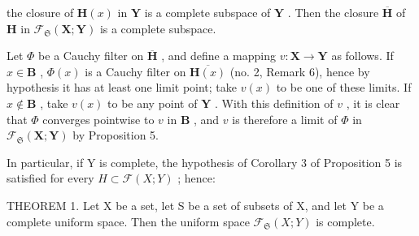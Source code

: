 the closure of \(\mathbf{H}(x)\) in \(\mathbf{Y}\) is a complete subspace of \(\mathbf{Y}\) . Then the closure \(\overline{\mathbf{H}}\) of \(\mathbf{H}\) in \(\mathcal{F}_{\mathfrak{S}}(\mathbf{X};\mathbf{Y})\) is a complete subspace.

Let \(\Phi\) be a Cauchy filter on \(\overline{\mathbf{H}}\) , and define a mapping \(v: \mathbf{X} \to \mathbf{Y}\) as follows. If \(x \in \mathbf{B}\) , \(\Phi(x)\) is a Cauchy filter on \(\overline{\mathbf{H}(x)}\) (no. 2, Remark 6), hence by hypothesis it has at least one limit point; take \(v(x)\) to be one of these limits. If \(x \notin \mathbf{B}\) , take \(v(x)\) to be any point of \(\mathbf{Y}\) . With this definition of \(v\) , it is clear that \(\Phi\) converges pointwise to \(v\) in \(\mathbf{B}\) , and \(v\) is therefore a limit of \(\Phi\) in \(\mathcal{F}_{\mathfrak{S}}(\mathbf{X}; \mathbf{Y})\) by Proposition 5.

In particular, if Y is complete, the hypothesis of Corollary 3 of Proposition 5 is satisfied for every \(H \subset \mathcal{F}(X; Y)\) ; hence:

THEOREM 1. Let X be a set, let S be a set of subsets of X, and let Y be a complete uniform space. Then the uniform space \(\mathcal{F}_{\mathfrak{S}}(X;Y)\) is complete.
\relax{}

